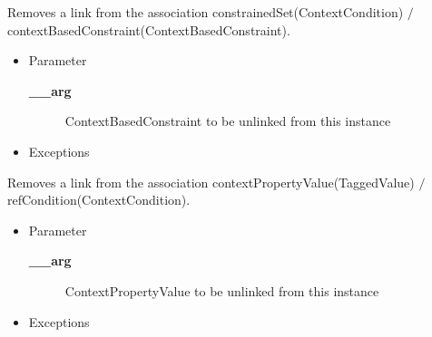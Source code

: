 \begin{desc}Removes a link from the association constrainedSet(ContextCondition)
 $/$ contextBasedConstraint(ContextBasedConstraint).
\begin{itemize}
\item{Parameter
  \begin{description}
   \item[{\bf \_\_arg}]{ContextBasedConstraint to be unlinked from this instance}
  \end{description}}
\end{itemize}
\begin{itemize}
\item{{Exceptions}
}
\end{itemize}
\end{desc}

\begin{desc}Removes a link from the association contextPropertyValue(TaggedValue)
 $/$ refCondition(ContextCondition).
\begin{itemize}
\item{Parameter
  \begin{description}
   \item[{\bf \_\_arg}]{ContextPropertyValue to be unlinked from this instance}
  \end{description}}
\end{itemize}
\begin{itemize}
\item{{Exceptions}
}
\end{itemize}
\end{desc}

